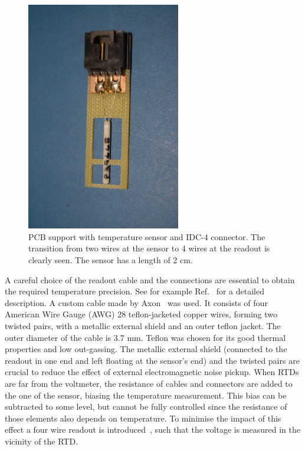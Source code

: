 \begin{figure}[htbp]
\begin{center}
\includegraphics[angle=-90, width=0.6\textwidth]{images/figure_1.jpg}%
\caption{PCB support with temperature sensor and IDC-4 connector. The transition from two wires at the sensor to 4 wires at the readout is clearly seen. The sensor has a length of 2 cm.
\label{fig:sensor}}
\end{center}
\end{figure}

A careful choice of the readout cable and the connections are essential to obtain the required temperature precision. See for example Ref.~\cite{minco} for a detailed description. A custom cable made by Axon~\cite{axon} was used. It consists of four American Wire Gauge (AWG) 28 teflon-jacketed copper wires, forming two twisted pairs, with a metallic external shield and an outer teflon jacket. The outer diameter of the cable is 3.7 mm. Teflon was chosen for its good thermal properties and low out-gassing. The metallic external shield (connected to the readout in one end and left floating at the sensor's end) and the twisted pairs are crucial to reduce the effect of external electromagnetic noise pickup. When RTDs are far from the voltmeter, the resistance of cables and connectors are added to the one of the sensor, biasing the temperature measurement. This bias can be subtracted to some level, but cannot be fully controlled since the resistance of those elements also depends on temperature. To minimise the impact of this effect a four wire readout is introduced~\cite{minco}, such that the voltage is measured in the vicinity of the RTD.  

